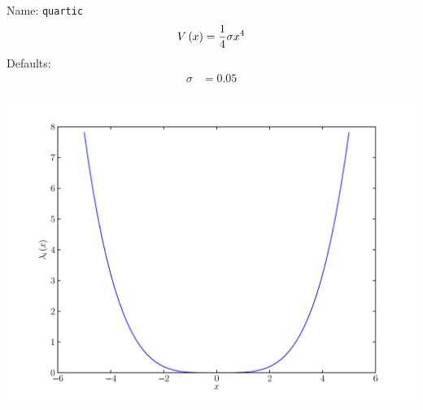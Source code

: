 \documentclass[a4paper,10pt]{report}
\begin{document}
\begin{minipage}{0.5\linewidth}
  Name:    \texttt{quartic}
  \begin{equation*}
    V\left( x \right) = \frac{1}{4} \sigma x^{4}
  \end{equation*}
  Defaults:
  \begin{align*}
    \sigma & = 0.05
  \end{align*}
\end{minipage}
\begin{minipage}{0.5\linewidth}
  \begin{center}
    \includegraphics[scale=0.25]{./fig/quartic.pdf}
  \end{center}
\end{minipage}
\end{document}
